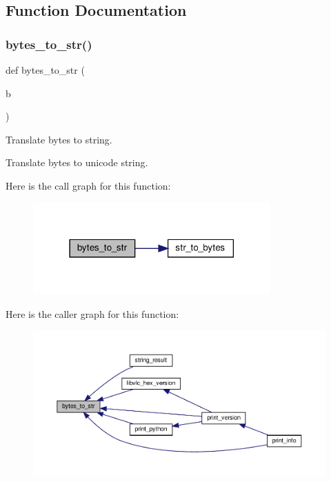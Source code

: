 \subsection{Function Documentation}
\mbox{\label{namespacevlc_acbb0aea5298eb7fbb31bea66b069b1b2}} 
\subsubsection{\texorpdfstring{bytes\+\_\+to\+\_\+str()}{bytes\_to\_str()}}
{\footnotesize\ttfamily def bytes\+\_\+to\+\_\+str (\begin{DoxyParamCaption}\item[{}]{b }\end{DoxyParamCaption})}

\begin{DoxyVerb}Translate bytes to string.
\end{DoxyVerb}


\begin{DoxyVerb}Translate bytes to unicode string.
\end{DoxyVerb}
 Here is the call graph for this function\+:
\nopagebreak
\begin{figure}[H]
\begin{center}
\leavevmode
\includegraphics[width=258pt]{namespacevlc_acbb0aea5298eb7fbb31bea66b069b1b2_cgraph}
\end{center}
\end{figure}
Here is the caller graph for this function\+:
\nopagebreak
\begin{figure}[H]
\begin{center}
\leavevmode
\includegraphics[width=350pt]{namespacevlc_acbb0aea5298eb7fbb31bea66b069b1b2_icgraph}
\end{center}
\end{figure}
\mbox{\label{namespacevlc_aaddf7ebb083eb66131f099136cf6f583}} 
